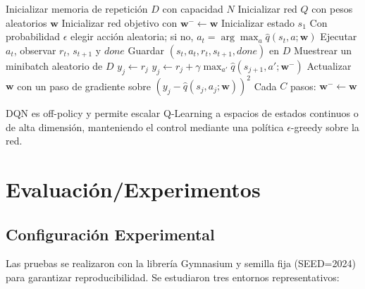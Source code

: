 \begin{algorithm}[!h]
\caption{Deep Q-Learning con Experience Replay}\label{algo:dqn}
\begin{algorithmic}[1]
\State Inicializar memoria de repetición $D$ con capacidad $N$
\State Inicializar red $Q$ con pesos aleatorios $\mathbf{w}$
\State Inicializar red objetivo con $\mathbf{w}^- \gets \mathbf{w}$
    \State Inicializar estado $s_1$
        \State Con probabilidad $\epsilon$ elegir acción aleatoria; si no, $a_t=\arg\max_a \hat{q}(s_t,a;\mathbf{w})$
        \State Ejecutar $a_t$, observar $r_t$, $s_{t+1}$ y $done$
        \State Guardar $(s_t,a_t,r_t,s_{t+1},done)$ en $D$
        \State Muestrear un minibatch aleatorio de $D$
                \State $y_j \gets r_j$
            \Else
                \State $y_j \gets r_j + \gamma \max_{a'} \hat{q}(s_{j+1},a';\mathbf{w}^-)$
            \EndIf
        \EndFor
        \State Actualizar $\mathbf{w}$ con un paso de gradiente sobre $(y_j-\hat{q}(s_j,a_j;\mathbf{w}))^2$
        \State Cada $C$ pasos: $\mathbf{w}^- \gets \mathbf{w}$
    \EndFor
\EndFor
\end{algorithmic}
\end{algorithm}

DQN es off-policy y permite escalar Q-Learning a espacios de estados continuos o de alta dimensión, manteniendo el control mediante una política $\epsilon$-greedy sobre la red.
\section{Evaluación/Experimentos}

\subsection{Configuración Experimental}

Las pruebas se realizaron con la librería Gymnasium y semilla fija (SEED=2024) para garantizar reproducibilidad. Se estudiaron tres entornos representativos:

